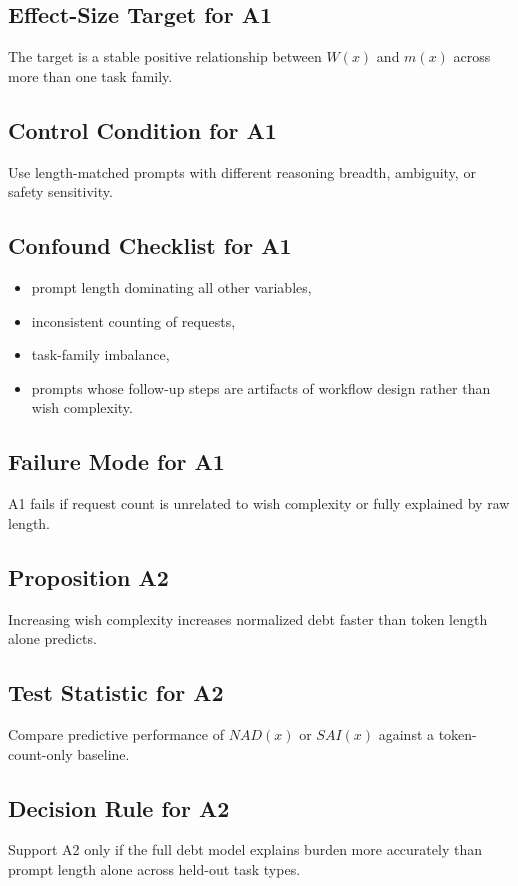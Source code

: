 \documentclass[11pt]{article}
\begin{document}
\subsection{Effect-Size Target for A1}
The target is a stable positive relationship between $W(x)$ and $m(x)$ across more than one task family.

\subsection{Control Condition for A1}
Use length-matched prompts with different reasoning breadth, ambiguity, or safety sensitivity.

\subsection{Confound Checklist for A1}
\begin{itemize}[leftmargin=*]
\item prompt length dominating all other variables,
\item inconsistent counting of requests,
\item task-family imbalance,
\item prompts whose follow-up steps are artifacts of workflow design rather than wish complexity.
\end{itemize}

\subsection{Failure Mode for A1}
A1 fails if request count is unrelated to wish complexity or fully explained by raw length.

\subsection{Proposition A2}
Increasing wish complexity increases normalized debt faster than token length alone predicts.

\subsection{Test Statistic for A2}
Compare predictive performance of $NAD(x)$ or $SAI(x)$ against a token-count-only baseline.

\subsection{Decision Rule for A2}
Support A2 only if the full debt model explains burden more accurately than prompt length alone across held-out task types.
\end{document}
